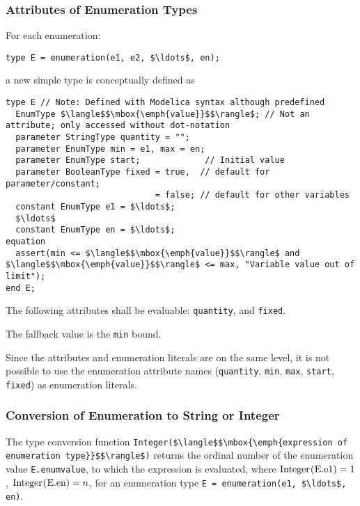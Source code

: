 \subsubsection{Attributes of Enumeration Types}\label{attributes-of-enumeration-types}

For each enumeration:
\begin{lstlisting}[language=modelica]
type E = enumeration(e1, e2, $\ldots$, en);
\end{lstlisting}
a new simple type is conceptually defined as
\begin{lstlisting}[language=modelica]
type E // Note: Defined with Modelica syntax although predefined
  EnumType $\langle$$\mbox{\emph{value}}$$\rangle$; // Not an attribute; only accessed without dot-notation
  parameter StringType quantity = "";
  parameter EnumType min = e1, max = en;
  parameter EnumType start;             // Initial value
  parameter BooleanType fixed = true,  // default for parameter/constant;
                              = false; // default for other variables
  constant EnumType e1 = $\ldots$;
  $\ldots$
  constant EnumType en = $\ldots$;
equation
  assert(min <= $\langle$$\mbox{\emph{value}}$$\rangle$ and $\langle$$\mbox{\emph{value}}$$\rangle$ <= max, "Variable value out of limit");
end E;
\end{lstlisting}

The following attributes shall be evaluable: \lstinline!quantity!, and \lstinline!fixed!.

The fallback value is the \lstinline!min! bound.

\begin{nonnormative}
Since the attributes and enumeration literals are on the same
level, it is not possible to use the enumeration attribute names
(\lstinline!quantity!, \lstinline!min!, \lstinline!max!, \lstinline!start!, \lstinline!fixed!) as enumeration literals.
\end{nonnormative}

\subsubsection{Conversion of Enumeration to String or Integer}\label{conversion-of-enumeration-to-string-or-integer}\label{type-conversion-of-enumeration-values-to-string-or-integer}

The type conversion function \lstinline!Integer($\langle$$\mbox{\emph{expression of enumeration type}}$$\rangle$)! returns the ordinal number of the enumeration value \lstinline!E.enumvalue!, to which the expression is evaluated, where $\text{\lstinline!Integer(E.e1)!} = 1$, $\text{\lstinline!Integer(E.en)!} = n$, for an enumeration type \lstinline!E = enumeration(e1, $\ldots$, en)!.

